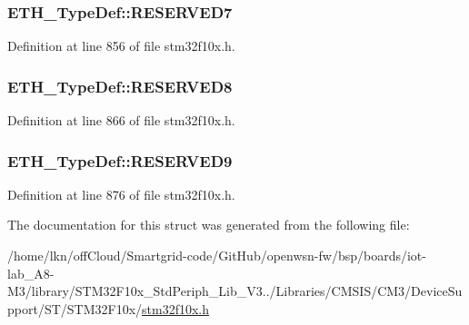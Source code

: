 \subsubsection[{\texorpdfstring{R\+E\+S\+E\+R\+V\+E\+D7}{RESERVED7}}]{ E\+T\+H\+\_\+\+Type\+Def\+::\+R\+E\+S\+E\+R\+V\+E\+D7}\hypertarget{struct_e_t_h___type_def_a47e35fda6c33b0fda10a0b3faeb635d9}{}\label{struct_e_t_h___type_def_a47e35fda6c33b0fda10a0b3faeb635d9}


Definition at line 856 of file stm32f10x.\+h.

\subsubsection[{\texorpdfstring{R\+E\+S\+E\+R\+V\+E\+D8}{RESERVED8}}]{ E\+T\+H\+\_\+\+Type\+Def\+::\+R\+E\+S\+E\+R\+V\+E\+D8}\hypertarget{struct_e_t_h___type_def_a6132b775878d0a7a5ff6ec30a9bbd471}{}\label{struct_e_t_h___type_def_a6132b775878d0a7a5ff6ec30a9bbd471}


Definition at line 866 of file stm32f10x.\+h.

\subsubsection[{\texorpdfstring{R\+E\+S\+E\+R\+V\+E\+D9}{RESERVED9}}]{ E\+T\+H\+\_\+\+Type\+Def\+::\+R\+E\+S\+E\+R\+V\+E\+D9}\hypertarget{struct_e_t_h___type_def_a2a3572dff49da3dbf983ab8498c5f959}{}\label{struct_e_t_h___type_def_a2a3572dff49da3dbf983ab8498c5f959}


Definition at line 876 of file stm32f10x.\+h.



The documentation for this struct was generated from the following file\+:\begin{DoxyCompactItemize}
\item 
/home/lkn/off\+Cloud/\+Smartgrid-\/code/\+Git\+Hub/openwsn-\/fw/bsp/boards/iot-\/lab\+\_\+\+A8-\/\+M3/library/\+S\+T\+M32\+F10x\+\_\+\+Std\+Periph\+\_\+\+Lib\+\_\+\+V3../\+Libraries/\+C\+M\+S\+I\+S/\+C\+M3/\+Device\+Support/\+S\+T/\+S\+T\+M32\+F10x/\hyperlink{iot-lab___a8-_m3_2library_2_s_t_m32_f10x___std_periph___lib___v3_85_80_2_libraries_2_c_m_s_i_s_26497265545392eb5694b064ae15018db}{stm32f10x.\+h}\end{DoxyCompactItemize}
